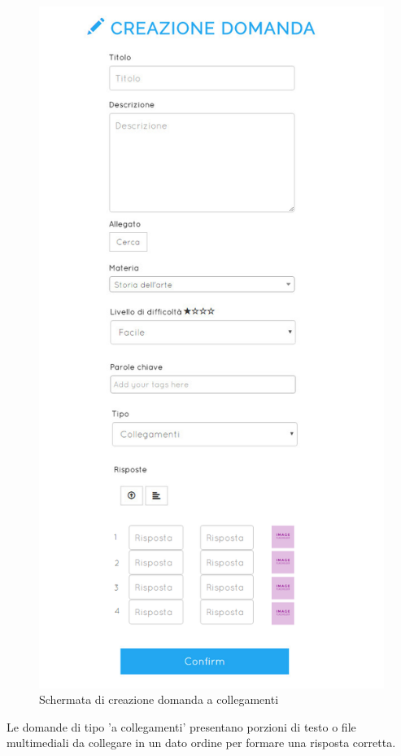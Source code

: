 \documentclass[a4paper, titlepage]{article}
\begin{document}
	 \begin{figure}[!h]
	 	\centering
	 	\includegraphics[scale=0.33]{Img/screen_CreazioneDomandaCollegamenti.png}
	 	\caption{Schermata di creazione domanda a collegamenti}
	 \end{figure}
	 Le domande di tipo 'a collegamenti' presentano porzioni di testo o file multimediali da collegare in un dato ordine per formare una risposta corretta.
\end{document}
